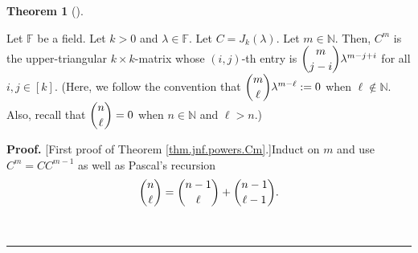 \documentclass[numbers=enddot,12pt,final,onecolumn,notitlepage]{scrartcl}%
\numberwithin{exer}{subsection}
\theoremstyle{definition}
\newtheorem{theo}{Theorem}[subsection]
\newenvironment{theorem}[1][]
{\begin{theo}[#1]\begin{leftbar}}
{\end{leftbar}\end{theo}}
\newenvironment{proof}[1][Proof]{\noindent\textbf{#1.} }{\ \rule{0.5em}{0.5em}}
\begin{document}
\begin{theorem}
\label{thm.jnf.powers.Cm}Let $\mathbb{F}$ be a field. Let $k>0$ and
$\lambda\in\mathbb{F}$. Let $C=J_{k}\left(  \lambda\right)  $. Let
$m\in\mathbb{N}$. Then, $C^{m}$ is the upper-triangular $k\times k$-matrix
whose $\left(  i,j\right)  $-th entry is $\dbinom{m}{j-i}\lambda^{m-j+i}$ for
all $i,j\in\left[  k\right]  $. (Here, we follow the convention that
$\dbinom{m}{\ell}\lambda^{m-\ell}:=0$ when $\ell\notin\mathbb{N}$. Also,
recall that $\dbinom{n}{\ell}=0$ when $n\in\mathbb{N}$ and $\ell>n$.)
\end{theorem}

\begin{proof}
[First proof of Theorem \ref{thm.jnf.powers.Cm}.]Induct on $m$ and use
$C^{m}=CC^{m-1}$ as well as Pascal's recursion%
\[
\dbinom{n}{\ell}=\dbinom{n-1}{\ell}+\dbinom{n-1}{\ell-1}.
\]

\end{proof}
\end{document}
